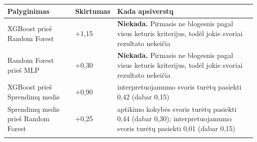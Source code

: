 \begingroup
\footnotesize
\setlength{\tabcolsep}{4pt}
\begin{tabularx}{\textwidth}{@{}>{\raggedright\arraybackslash}p{5.4cm}>{\centering\arraybackslash}p{1.6cm}>{\raggedright\arraybackslash}X@{}}
\toprule
\textbf{Palyginimas} & \textbf{Skirtumas} & \textbf{Kada apsiverstų} \\
\midrule
XGBoost prieš Random Forest & $+$1,15 & \textbf{Niekada.} Pirmasis ne blogesnis pagal visus keturis kriterijus, todėl jokie svoriai rezultato nekeičia \\
\addlinespace[2pt]
Random Forest prieš MLP & $+$0,30 & \textbf{Niekada.} Pirmasis ne blogesnis pagal visus keturis kriterijus, todėl jokie svoriai rezultato nekeičia \\
\addlinespace[2pt]
XGBoost prieš Sprendimų medis & $+$0,90 & interpretuojamumo svoris turėtų pasiekti 0,42 (dabar 0,15) \\
\addlinespace[2pt]
Sprendimų medis prieš Random Forest & $+$0,25 & aptikimo kokybės svoris turėtų pasiekti 0,44 (dabar 0,30); interpretuojamumo svoris turėtų pasiekti 0,01 (dabar 0,15) \\
\addlinespace[2pt]
\bottomrule
\end{tabularx}
\endgroup

